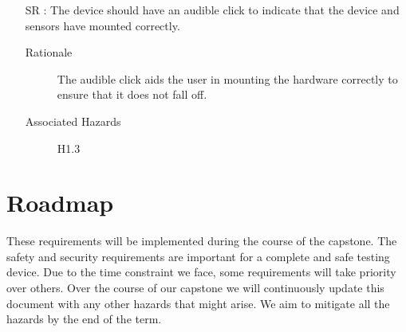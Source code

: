 \documentclass[12pt]{article}
\newcounter{reqnum} %
\begin{document}
\begin{itemize}
  \item[SR \refstepcounter{reqnum}\thereqnum:] The device should have an audible click to indicate that the device and sensors have mounted correctly.
    \begin{description} \item[Rationale] The audible click aids the user in mounting the hardware correctly to ensure that it does not fall off.   \end{description}
    \begin{description} \item[Associated Hazards] H1.3  \end{description}
\end{itemize}


\section{Roadmap}

These requirements will be implemented during the course of the capstone. The safety and security requirements are important for a complete and safe testing device. Due to the time constraint we face, some requirements will take priority over others. Over the course of our capstone we will continuously update this document with any other hazards that might arise. We aim to mitigate all the hazards by the end of the term.
\end{document}
